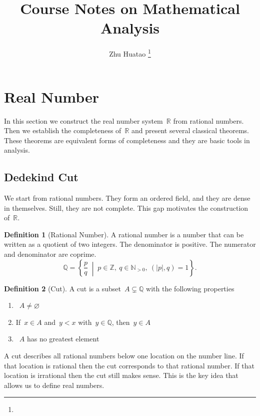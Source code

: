 \documentclass[12pt,a4paper,draft]{article}  %
\title{Course Notes on Mathematical Analysis}
\date{\DTMnow}
\author{
    Zhu Huatao
    \thanks{}
}
\theoremstyle{definition}
\newtheorem{definition}{Definition}[section]
\numberwithin{equation}{section}
\newcommand{\RR}{\mathbb{R}}
\newcommand{\ZZ}{\mathbb{Z}}
\newcommand{\NN}{\mathbb{N}}
\begin{document}
\maketitle

\section{Real Number}

In this section we construct the real number system~$\RR$ from rational numbers.
Then we establish the completeness of~$\RR$ and present several classical theorems.
These theorems are equivalent forms of completeness and they are basic tools in analysis.

\subsection{Dedekind Cut}

We start from rational numbers.
They form an ordered field, and they are dense in themselves.
Still, they are not complete.
This gap motivates the construction of~$\RR$.

\begin{definition}[Rational Number]
A rational number is a number that can be written as a quotient of two integers.
The denominator is positive.
The numerator and denominator are coprime.
\[
\mathbb{Q}
=
\left\{
\frac{p}{q}
\;\middle|\;
p \in \ZZ,\ q \in \NN_{>0},\ (|p|,q)=1
\right\}.
\]
\end{definition}

\begin{definition}[Cut]
A cut is a subset~$A \subsetneq \mathbb{Q}$ with the following properties
\begin{enumerate}
\item~$A \neq \varnothing$
\item If~$x \in A$ and~$y < x$ with~$y \in \mathbb{Q}$, then~$y \in A$
\item~$A$ has no greatest element
\end{enumerate}
\end{definition}

A cut describes all rational numbers below one location on the number line.
If that location is rational then the cut corresponds to that rational number.
If that location is irrational then the cut still makes sense.
This is the key idea that allows us to define real numbers.
\end{document}

